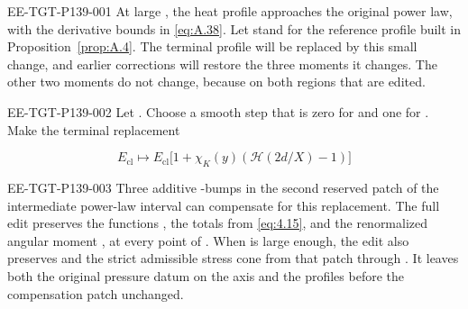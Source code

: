 %
\begin{EESegment}{EE-TGT-P139-001}
At large , the heat profile approaches the original power law, with the derivative bounds in
\eqref{eq:A.38}. Let  stand for the reference profile built in
Proposition~\ref{prop:A.4}. The terminal profile will be replaced by this small change, and earlier corrections will
restore the three moments it changes. The other two moments do not change, because  on both
regions that are edited.
\end{EESegment}

\begin{proposition}\label{prop:A.7}
\begin{EESegment}{EE-TGT-P139-002}
Let . Choose a smooth step
 that is zero for
 and one for . Make the terminal replacement
\end{EESegment}
\begin{equation}
  E_{\mathrm{cl}}\longmapsto E_{\mathrm{cl}}
  \bigl[1+\chi_K(y)(\mathcal H(2d/X)-1)\bigr]
  \tag{A.39}\label{eq:A.39}
\end{equation}
\begin{EESegment}{EE-TGT-P139-003}
Three additive -bumps in the second reserved patch of the intermediate power-law interval can
compensate for this replacement. The full edit preserves the functions , the totals
 from \eqref{eq:4.15}, and the renormalized angular moment
, at every point of
. When  is large enough, the edit also preserves
 and the strict admissible stress cone from that patch through
. It leaves both the original pressure datum on the axis and the profiles before the
compensation patch unchanged.
\end{EESegment}
\end{proposition}

